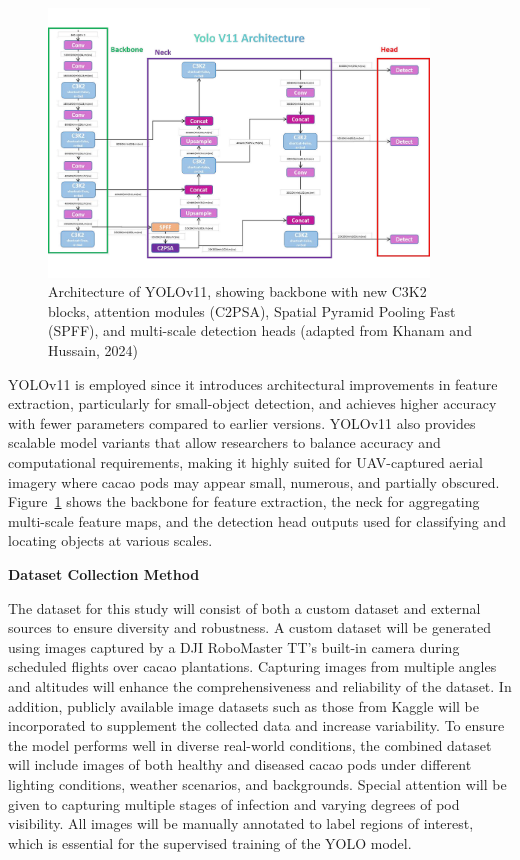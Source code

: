 \begin{figure}[H]
	\centering
	\caption{Architecture of YOLOv11, showing backbone with new C3K2 blocks, attention modules (C2PSA), Spatial Pyramid Pooling Fast (SPFF), and multi-scale detection heads (adapted from Khanam and Hussain, 2024)}
	\label{fig:yolov11_architecture}
	\includegraphics[width=0.9\textwidth]{figures/yolov11.pdf}
\end{figure}

YOLOv11 is employed since it introduces architectural improvements in feature extraction, particularly for small-object detection, and achieves higher accuracy with fewer parameters compared to earlier versions. YOLOv11 also provides scalable model variants that allow researchers to balance accuracy and computational requirements, making it highly suited for UAV-captured aerial imagery where cacao pods may appear small, numerous, and partially obscured. Figure~\ref{fig:yolov11_architecture} shows the  backbone for feature extraction, the neck for aggregating multi-scale feature maps, and the detection head outputs used for classifying and locating objects at various scales.

\noindent \textbf{Dataset Collection Method}

The dataset for this study will consist of both a custom dataset and external sources to ensure diversity and robustness. A custom dataset will be generated using images captured by a DJI RoboMaster TT’s built-in camera during scheduled flights over cacao plantations. Capturing images from multiple angles and altitudes will enhance the comprehensiveness and reliability of the dataset. In addition, publicly available image datasets such as those from Kaggle will be incorporated to supplement the collected data and increase variability. To ensure the model performs well in diverse real-world conditions, the combined dataset will include images of both healthy and diseased cacao pods under different lighting conditions, weather scenarios, and backgrounds. Special attention will be given to capturing multiple stages of infection and varying degrees of pod visibility. All images will be manually annotated to label regions of interest, which is essential for the supervised training of the YOLO model.

